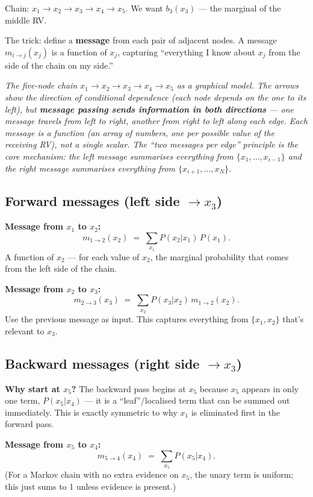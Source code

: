 \documentclass[11pt, a4paper]{article}
\begin{document}
Chain: $x_1 \to x_2 \to x_3 \to x_4 \to x_5$. We want $b_3(x_3)$ — the marginal of the middle RV.

The trick: define a \textbf{message} from each pair of adjacent nodes. A message $m_{i\to j}(x_j)$ is a function of $x_j$, capturing ``everything I know about $x_j$ from the side of the chain on my side.''

\begin{center}

\footnotesize\textit{The five-node chain $x_1 \to x_2 \to x_3 \to x_4 \to x_5$ as a graphical model. The arrows show the direction of conditional dependence (each node depends on the one to its left), but \textbf{message passing sends information in both directions} --- one message travels from left to right, another from right to left along each edge. Each message is a function (an array of numbers, one per possible value of the receiving RV), not a single scalar. The ``two messages per edge'' principle is the core mechanism: the left message summarises everything from $\{x_1, \ldots, x_{i-1}\}$ and the right message summarises everything from $\{x_{i+1}, \ldots, x_N\}$.}
\end{center}

\subsection{Forward messages (left side $\to x_3$)}

\textbf{Message from $x_1$ to $x_2$:}
\[
m_{1\to 2}(x_2) \;=\; \sum_{x_1} P(x_2 | x_1)\,P(x_1).
\]
A function of $x_2$ — for each value of $x_2$, the marginal probability that comes from the left side of the chain.

\textbf{Message from $x_2$ to $x_3$:}
\[
m_{2\to 3}(x_3) \;=\; \sum_{x_2} P(x_3 | x_2)\,m_{1\to 2}(x_2).
\]
Use the previous message as input. This captures everything from $\{x_1, x_2\}$ that's relevant to $x_3$.

\subsection{Backward messages (right side $\to x_3$)}

\textbf{Why start at $x_5$?} The backward pass begins at $x_5$ because $x_5$ appears in only one term, $P(x_5|x_4)$ — it is a ``leaf''/localised term that can be summed out immediately. This is exactly symmetric to why $x_1$ is eliminated first in the forward pass.

\textbf{Message from $x_5$ to $x_4$:}
\[
m_{5\to 4}(x_4) \;=\; \sum_{x_5} P(x_5 | x_4).
\]
(For a Markov chain with no extra evidence on $x_5$, the unary term is uniform; this just sums to 1 unless evidence is present.)
\end{document}
